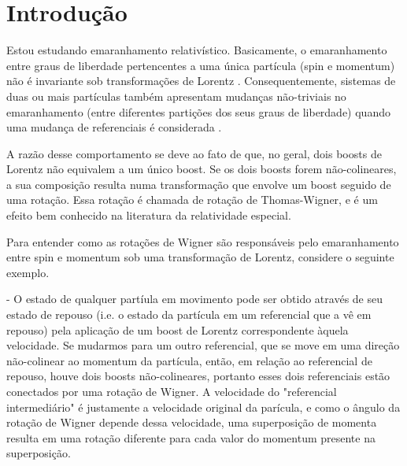 \documentclass[11pt,a4paper,notitlepage]{article}
\begin{document}
\newcommand{\be}{\begin{eqnarray}}
\newcommand{\ee}{\end{eqnarray}}
\newcommand{\ket}[1]{\mbox{$ | #1 \rangle $}}
\newcommand{\bra}[1]{\mbox{$ \langle #1 | $}}
\newcommand{\Unit}{\mathbb{1}}
\newcommand{\Hop}{\mathcal{H}}


\section{Introdução}

Estou estudando emaranhamento relativístico. Basicamente, o emaranhamento entre graus de liberdade pertencentes a uma única partícula (spin e momentum) não é invariante sob transformações de Lorentz \cite{peres2002}. Consequentemente, sistemas de duas ou mais partículas também apresentam mudanças não-triviais no emaranhamento (entre diferentes partições dos seus graus de liberdade) quando uma mudança de referenciais é considerada \cite{gingrich_adami_2002}.

A razão desse comportamento se deve ao fato de que, no geral, dois boosts de Lorentz não equivalem a um único boost. Se os dois boosts forem não-colineares, a sua composição resulta numa transformação que envolve um boost seguido de uma rotação. Essa rotação é chamada de rotação de Thomas-Wigner, e é um efeito bem conhecido na literatura da relatividade especial.

Para entender como as rotações de Wigner são responsáveis pelo emaranhamento entre spin e momentum sob uma transformação de Lorentz, considere o seguinte exemplo.

- O estado de qualquer partíula em movimento pode ser obtido através de seu estado de repouso (i.e. o estado da partícula em um referencial que a vê em repouso) pela aplicação de um boost de Lorentz correspondente àquela velocidade. Se mudarmos para um outro referencial, que se move em uma direção não-colinear ao momentum da partícula, então, em relação ao referencial de repouso, houve dois boosts não-colineares, portanto esses dois referenciais estão conectados por uma rotação de Wigner. A velocidade do "referencial intermediário" é justamente a velocidade original da parícula, e como o ângulo da rotação de Wigner depende dessa velocidade, uma superposição de momenta resulta em uma rotação diferente para cada valor do momentum presente na superposição.
\end{document}
